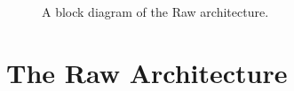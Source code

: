 \begin{figure}[t]
\centering
{}
\caption{A block diagram of the Raw architecture.
\protect\label{fig:raw-diagram}}
\end{figure}

\section{The Raw Architecture}
\label{sec:raw}
